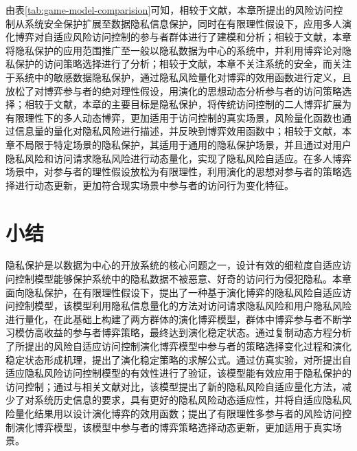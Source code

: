 由表\ref{tab:game-model-comparision}可知，相较于文献\cite{ni2010risk,shaikh2012dynamic,santos2016framework}，本章所提出的风险访问控制从系统安全保护扩展至数据隐私信息保护，同时在有限理性假设下，应用多人演化博弈对自适应风险访问控制的参与者群体进行了建模和分析；相较于文献\cite{wang2011quantified,zhang2018privacy}，本章将隐私保护的应用范围推广至一般以隐私数据为中心的系统中，并利用博弈论对隐私保护的访问策略选择进行了分析；相较于文献\cite{gao2018game,liu2016dynamic}，本章不关注系统的安全，而关注于系统中的敏感数据隐私保护，通过隐私风险量化对博弈的效用函数进行定义，且放松了对博弈参与者的绝对理性假设，用演化的思想动态分析参与者的访问策略选择；相较于文献\cite{helil2017non}，本章的主要目标是隐私保护，将传统访问控制的二人博弈扩展为有限理性下的多人动态博弈，更加适用于访问控制的真实场景，风险量化函数也通过信息量的量化对隐私风险进行描述，并反映到博弈效用函数中；相较于文献\cite{hu2014game}，本章不局限于特定场景的隐私保护，其适用于通用的隐私保护场景，并且通过对用户隐私风险和访问请求隐私风险进行动态量化，实现了隐私风险自适应。在多人博弈场景中，对参与者的理性假设放松为有限理性，利用演化的思想对参与者的策略选择进行动态更新，更加符合现实场景中参与者的访问行为变化特征。
 \section{小结}
隐私保护是以数据为中心的开放系统的核心问题之一，设计有效的细粒度自适应访问控制模型能够保护系统中的隐私数据不被恶意、好奇的访问行为侵犯隐私。本章面向隐私保护，在有限理性假设下，提出了一种基于演化博弈的隐私风险自适应访问控制模型，该模型利用隐私信息量化的方法对访问请求隐私风险和用户隐私风险进行量化，在此基础上构建了两方群体的演化博弈模型，群体中博弈参与者不断学习模仿高收益的参与者博弈策略，最终达到演化稳定状态。通过复制动态方程分析了所提出的风险自适应访问控制演化博弈模型中参与者的策略选择变化过程和演化稳定状态形成机理，提出了演化稳定策略的求解公式。通过仿真实验，对所提出自适应隐私风险访问控制模型的有效性进行了验证，该模型能有效应用于隐私保护的访问控制；通过与相关文献对比，该模型提出了新的隐私风险自适应量化方法，减少了对系统历史信息的要求，具有更好的隐私风险动态适应性，并将自适应隐私风险量化结果用以设计演化博弈的效用函数；提出了有限理性多参与者的风险访问控制演化博弈模型，该模型中参与者的博弈策略选择动态更新，更加适用于真实场景。
